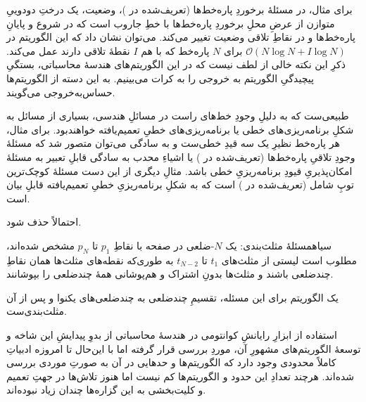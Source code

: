 \documentclass[a4paper,12pt]{article}
\renewcommand{\O}[1]{\mathcal{O}(#1)}
\begin{document}
برای مثال، در مسئلهٔ برخوردِ پاره‌خط‌ها (تعریف‌شده در )، وضعیت، یک درختِ دودوییِ متوازن از عرضِ محلِ برخوردِ پاره‌خط‌ها با خطِ جاروب است که در شروع و پایانِ پاره‌خط‌ها و در نقاطِ تلاقی وضعیت تغییر می‌کند. می‌توان نشان داد که این الگوریتم در 
$\O{N \log N + I \log N}$
برای $N$ پاره‌خط که با هم $I$ نقطهٔ تلاقی دارند عمل می‌کند. ذکرِ این نکته خالی از لطف نیست که در این الگوریتم‌های هندسهٔ محاسباتی، بستگیِ پیچیدگیِ الگوریتم به خروجی را به کرات می‌بینیم. به این دسته از الگوریتم‌ها حساس‌به‌خروجی 
 می‌گویند.
 
طبیعی‌ست که به دلیلِ وجودِ خط‌های راست در مسائلِ هندسی، بسیاری از مسائل به شکلِ برنامه‌ریزی‌های خطی یا برنامه‌ریزی‌های خطیِ تعمیم‌یافته
 خواهندبود.
برای مثال، هر پاره‌خط نظیرِ یک سه قیدِ خطی‌ست و به سادگی می‌توان متصور شد که مسئلهٔ وجودِ تلاقیِ پاره‌خط‌ها  (تعریف‌شده در ) یا اشیاءِ محدب به سادگی قابلِ تعبیر به مسئلهٔ امکان‌پذیریِ قیودِ برنامه‌ریزیِ خطی باشد. مثالِ دیگری از این دست مسئلهٔ کوچک‌ترین توپِ شامل (تعریف‌شده در ) است که به شکلِ برنامه‌ریزیِ خطیِ تعمیم‌یافته قابلِ بیان است.

احتمالاً حذف شود.

‌سیاه{مسئلهٔ مثلث‌بندی}: یک $N$-ضلعی در صفحه با نقاطِ $p_1$ تا $p_N$ مشخص شده‌اند، مطلوب است لیستی از مثلث‌های $t_1$ تا $t_{N-2}$ به طوری‌که نقطه‌های مثلث‌ها همان نقاطِ چندضلعی باشند و مثلث‌ها بدونِ اشتراک و هم‌پوشانی همهٔ چندضلعی را بپوشانند. 

یک الگوریتم برای این مسئله، تقسیمِ چندضلعی به چندضلعی‌های یکنوا و پس از آن مثلث‌بندی‌ست. 
  


استفاده از ابزارِ رایانشِ کوانتومی در هندسهٔ محاسباتی از بدوِ پیدایشِ این شاخه و توسعهٔ الگوریتم‌های مشهورِ آن، موردِ بررسی قرار گرفته  اما با این‌حال تا امروزه ادبیاتِ کاملاً محدودی وجود دارد که الگوریتم‌ها و حدهایی در آن به صورتِ‌ موردی بررسی شده‌اند. هرچند تعدادِ این حدود و الگوریتم‌ها کم نیست اما هنوز تلاش‌ها در جهتِ تعمیم و کلیت‌بخشی به این گزاره‌ها چندان زیاد نبوده‌اند.
\end{document}
